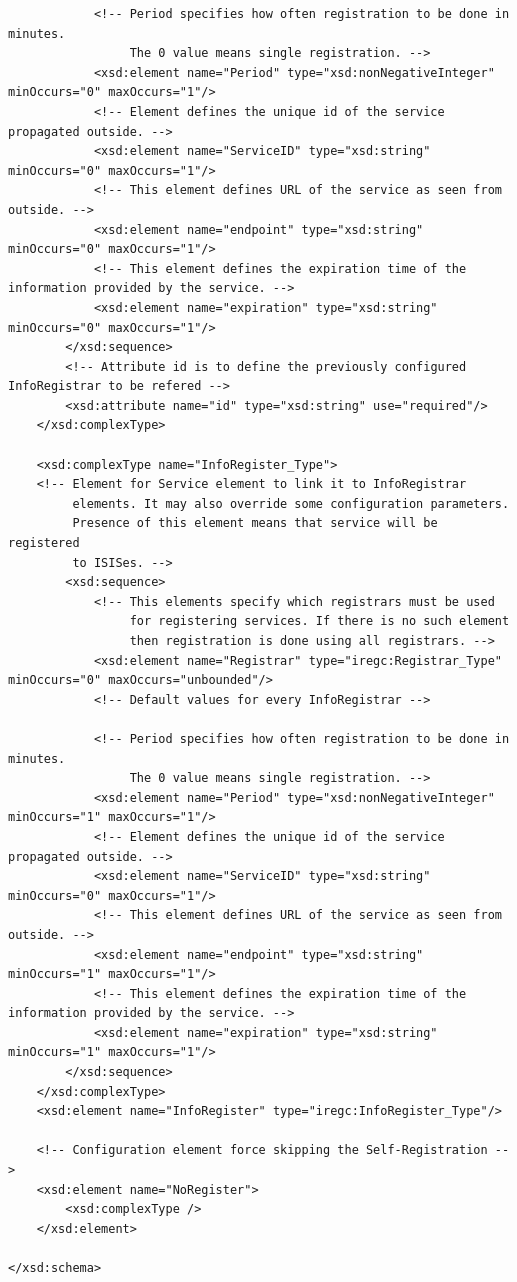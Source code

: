 \documentclass{book}
\begin{document}
\begin{verbatim}
            <!-- Period specifies how often registration to be done in minutes.
                 The 0 value means single registration. -->
            <xsd:element name="Period" type="xsd:nonNegativeInteger" minOccurs="0" maxOccurs="1"/>
            <!-- Element defines the unique id of the service propagated outside. -->
            <xsd:element name="ServiceID" type="xsd:string" minOccurs="0" maxOccurs="1"/>
            <!-- This element defines URL of the service as seen from outside. -->
            <xsd:element name="endpoint" type="xsd:string" minOccurs="0" maxOccurs="1"/>
            <!-- This element defines the expiration time of the information provided by the service. -->
            <xsd:element name="expiration" type="xsd:string" minOccurs="0" maxOccurs="1"/>
        </xsd:sequence>
        <!-- Attribute id is to define the previously configured InfoRegistrar to be refered -->
        <xsd:attribute name="id" type="xsd:string" use="required"/>
    </xsd:complexType>

    <xsd:complexType name="InfoRegister_Type">
    <!-- Element for Service element to link it to InfoRegistrar
         elements. It may also override some configuration parameters.
         Presence of this element means that service will be registered
         to ISISes. -->
        <xsd:sequence>
            <!-- This elements specify which registrars must be used
                 for registering services. If there is no such element
                 then registration is done using all registrars. -->
            <xsd:element name="Registrar" type="iregc:Registrar_Type" minOccurs="0" maxOccurs="unbounded"/>
            <!-- Default values for every InfoRegistrar -->

            <!-- Period specifies how often registration to be done in minutes.
                 The 0 value means single registration. -->
            <xsd:element name="Period" type="xsd:nonNegativeInteger" minOccurs="1" maxOccurs="1"/>
            <!-- Element defines the unique id of the service propagated outside. -->
            <xsd:element name="ServiceID" type="xsd:string" minOccurs="0" maxOccurs="1"/>
            <!-- This element defines URL of the service as seen from outside. -->
            <xsd:element name="endpoint" type="xsd:string" minOccurs="1" maxOccurs="1"/>
            <!-- This element defines the expiration time of the information provided by the service. -->
            <xsd:element name="expiration" type="xsd:string" minOccurs="1" maxOccurs="1"/>
        </xsd:sequence>
    </xsd:complexType>
    <xsd:element name="InfoRegister" type="iregc:InfoRegister_Type"/>

    <!-- Configuration element force skipping the Self-Registration -->
    <xsd:element name="NoRegister">
        <xsd:complexType />
    </xsd:element>

</xsd:schema>

\end{verbatim}
\end{document}
